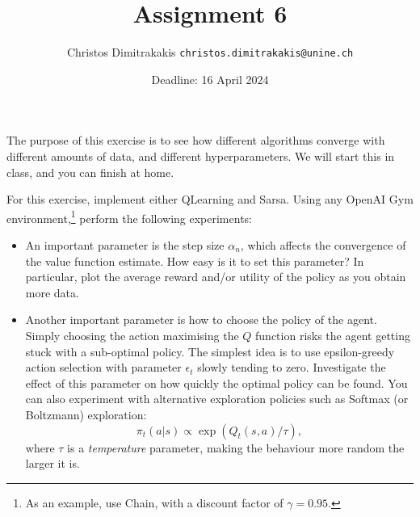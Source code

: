 \documentclass[twoside,a4paper]{article}
\begin{document}
\title{Assignment 6}
\author{Christos Dimitrakakis  \texttt{christos.dimitrakakis@unine.ch}}
\date{Deadline: 16 April 2024}
\maketitle

The purpose of this exercise is to see how different algorithms converge with different amounts of data, and different hyperparameters. We will start this in class, and you can finish at home.

For this exercise, implement either QLearning and Sarsa. Using any OpenAI Gym environment,\footnote{As an example, use Chain, with a discount factor of $\gamma = 0.95$.} perform the following experiments:
\begin{itemize}
\item An important parameter is the step size  $\alpha_n$, which affects the convergence of the value function estimate. How easy is it to set this parameter? In particular, plot the average reward and/or utility of the policy as you obtain more data.
\item Another important parameter is how to choose the policy of the agent. Simply choosing the action maximising the $Q$ function risks the agent getting stuck with a sub-optimal policy. The simplest idea is to use epsilon-greedy action selection  with parameter $\epsilon_t$ slowly tending to zero. Investigate the effect of this parameter on how quickly the optimal policy can be found. You can also experiment with alternative exploration policies such as Softmax (or Boltzmann) exploration:
  \[
    \pi_t(a | s) \propto \exp(Q_t(s, a)/\tau),
  \]
  where $\tau$ is a \emph{temperature} parameter, making the behaviour more random the larger it is.
  

\end{itemize}
\end{document}
